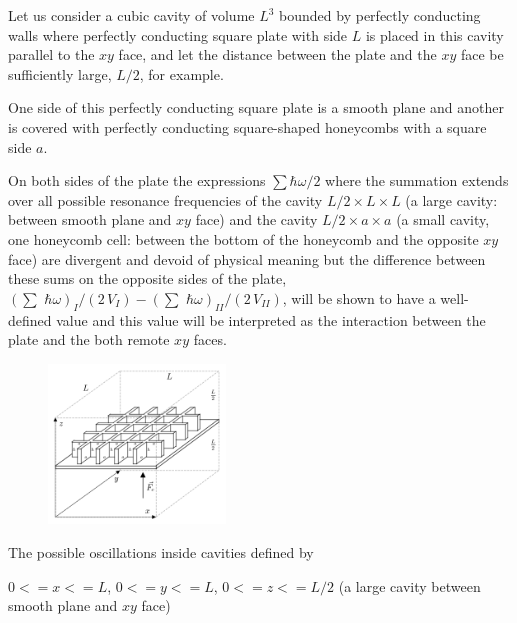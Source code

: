 \documentclass[twoside, 10pt, ptm]{article}
\begin{document}
\begin{multicols}{2}

    Let us consider a cubic cavity of volume \(L^3\) bounded by perfectly
conducting walls where perfectly conducting square plate with side
\(L\) is placed in this cavity parallel to the \(xy\) face, and let
the distance between the plate and the \(xy\) face be sufficiently large,
\(L/2\), for example.


One side of this perfectly conducting square plate is a smooth plane and
another is covered with perfectly conducting square-shaped honeycombs with
a square side \(a\).

On both sides of the plate the expressions \(\sum\hbar\omega\big/2\)
where the summation extends over all possible resonance frequencies of
the cavity \(L/2 \times L \times L\) (a large cavity: between smooth plane
and \(xy\) face) and the cavity \(L/2 \times a\times a\) (a small
cavity, one honeycomb cell: between the bottom of the honeycomb and the
opposite \(xy\) face) are divergent and devoid of physical meaning but
the difference between these sums on the opposite sides of the plate,
\(\left(\sum\,\,\hbar\omega\right)_{I}\big/{\left(2\,V_{I}\right)} - \left(\sum\,\,\hbar\omega\right)_{II}\big/{\left(2\,V_{II}\right)}\),
will be shown to have a well-defined value and this value will be
interpreted as the interaction between the plate and the both remote
\(xy\) faces.

\begin{figure}
\begin{center}
\includegraphics[width=0.42\textwidth]{honeycomb_box_L.png}
\caption{}{}
\end{center}
\label{fig:honeycomb_box_L}
\end{figure}

    The possible oscillations inside cavities defined by

    \(0<=x<=L\), \(0<=y<=L\), \(0<=z<=L/2\) (a large cavity between smooth
plane and \(xy\) face)


\end{multicols}
\end{document}
